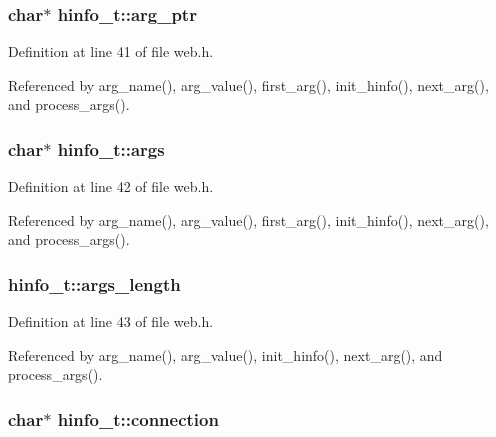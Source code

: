 \subsubsection[{\texorpdfstring{arg\+\_\+ptr}{arg_ptr}}]{\setlength{\rightskip}{0pt plus 5cm}char$\ast$ hinfo\+\_\+t\+::arg\+\_\+ptr}\hypertarget{structhinfo__t_a0d27c1b7d2730373f93342961b9cb18d}{}\label{structhinfo__t_a0d27c1b7d2730373f93342961b9cb18d}


Definition at line 41 of file web.\+h.



Referenced by arg\+\_\+name(), arg\+\_\+value(), first\+\_\+arg(), init\+\_\+hinfo(), next\+\_\+arg(), and process\+\_\+args().

\subsubsection[{\texorpdfstring{args}{args}}]{\setlength{\rightskip}{0pt plus 5cm}char$\ast$ hinfo\+\_\+t\+::args}\hypertarget{structhinfo__t_a62bf198b939a9d932bcac763ebc51443}{}\label{structhinfo__t_a62bf198b939a9d932bcac763ebc51443}


Definition at line 42 of file web.\+h.



Referenced by arg\+\_\+name(), arg\+\_\+value(), first\+\_\+arg(), init\+\_\+hinfo(), next\+\_\+arg(), and process\+\_\+args().

\subsubsection[{\texorpdfstring{args\+\_\+length}{args_length}}]{ hinfo\+\_\+t\+::args\+\_\+length}\hypertarget{structhinfo__t_a003130c9489dfe54a76df23a85fae62f}{}\label{structhinfo__t_a003130c9489dfe54a76df23a85fae62f}


Definition at line 43 of file web.\+h.



Referenced by arg\+\_\+name(), arg\+\_\+value(), init\+\_\+hinfo(), next\+\_\+arg(), and process\+\_\+args().

\subsubsection[{\texorpdfstring{connection}{connection}}]{\setlength{\rightskip}{0pt plus 5cm}char$\ast$ hinfo\+\_\+t\+::connection}\hypertarget{structhinfo__t_a3fbd7d81842222192fe8e8570451e89f}{}\label{structhinfo__t_a3fbd7d81842222192fe8e8570451e89f}


